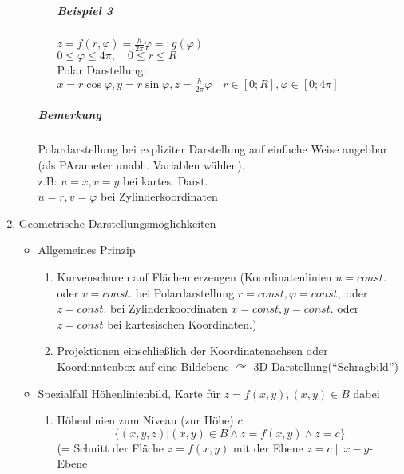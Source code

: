 \documentclass[a4paper]{scrartcl}
\begin{document}
\begin{enumerate}
\begin{itemize}
\begin{enumerate}
\subparagraph{Beispiel 3} $z=f(r,\varphi) = \frac{h}{2\pi} \varphi =: g(\varphi)$\\ $0\leq \varphi \leq 4 \pi, \quad 0 \leq r \leq R$\\
Polar Darstellung:\\
$x=r \cos{\varphi}, y= r\sin{\varphi}, z = \frac{h}{2\pi} \varphi \quad r \in [0;R], \varphi \in [0;4\pi]$
\end{enumerate}

\subparagraph{Bemerkung} Polardarstellung bei expliziter Darstellung auf einfache Weise angebbar (als PArameter unabh. Variablen wählen).\\
z.B: $u=x,v=y$ bei kartes. Darst.\\
$u=r, v = \varphi$ bei Zylinderkoordinaten

\end{itemize}
\item Geometrische Darstellungsmöglichkeiten
\begin{itemize}
\item Allgemeines Prinzip
\begin{enumerate}
\item Kurvenscharen auf Flächen erzeugen (Koordinatenlinien $u=const.$ oder $v= const.$ bei Polardarstellung $r=const, \varphi= const,$ oder $z= const.$ bei Zylinderkoordinaten $x=const, y=const.$ oder $z=const$ bei kartesischen Koordinaten.)
\item Projektionen einschließlich der Koordinatenachsen oder Koordinatenbox auf eine Bildebene $\curvearrowright$ 3D-Darstellung("`Schrägbild"')
\end{enumerate}

\item Spezialfall Höhenlinienbild, Karte für $z=f(x,y),(x,y) \in B$ dabei 
\begin{enumerate}
\item Höhenlinien zum Niveau (zur Höhe) $c$:
\[ \{ (x,y,z) | (x,y) \in B \wedge z=f(x,y) \wedge z=c \} \]
(= Schnitt der Fläche $z=f(x,y)$ mit der Ebene $z=c \parallel x-y$-Ebene


\end{enumerate}
\end{itemize}
\end{enumerate}
\end{document}
